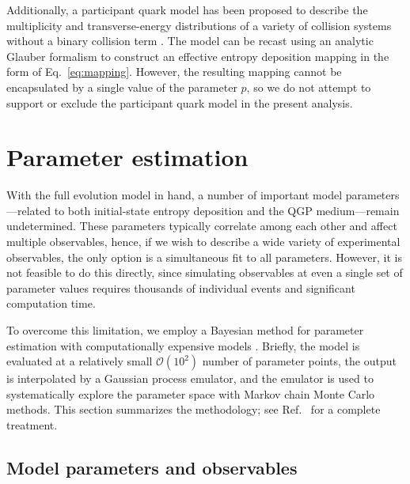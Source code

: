 \documentclass[aps,prc,reprint,amsmath,nofootinbib,noeprint]{revtex4-1}
\newcommand{\order}[1]{$\mathcal O(10^{#1})$}
\begin{document}
Additionally, a participant quark model has been proposed to describe the multiplicity and transverse-energy distributions of a variety of collision systems without a binary collision term \cite{Adler:2013aqf, Adare:2015bua}.
The model can be recast using an analytic Glauber formalism to construct an effective entropy deposition mapping in the form of Eq.~\eqref{eq:mapping}.
However, the resulting mapping cannot be encapsulated by a single value of the parameter $p$, so we do not attempt to support or exclude the participant quark model in the present analysis.


\section{Parameter estimation}

With the full evolution model in hand, a number of important model parameters---related to both initial-state entropy deposition and the QGP medium---remain undetermined.
These parameters typically correlate among each other and affect multiple observables, hence, if we wish to describe a wide variety of experimental observables, the only option is a simultaneous fit to all parameters.
However, it is not feasible to do this directly, since simulating observables at even a single set of parameter values requires thousands of individual events and significant computation time.

To overcome this limitation, we employ a Bayesian method for parameter estimation with computationally expensive models \cite{OHagan:2006ba,Higdon:2008cmc,Higdon:2014tva,Wesolowski:2015fqa}.
Briefly, the model is evaluated at a relatively small \order 2 number of parameter points, the output is interpolated by a Gaussian process emulator, and the emulator is used to systematically explore the parameter space with Markov chain Monte Carlo methods.
This section summarizes the methodology; see Ref.~\cite{Bernhard:2015hxa} for a complete treatment.

\subsection{Model parameters and observables}
\end{document}
